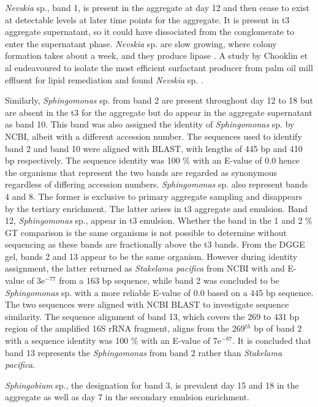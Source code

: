 \documentclass[11pt]{article}
\begin{document}
\emph{Nevskia} sp., band 1, is present in the aggregate at day 12 and then cease to exist at detectable levels at later time points for the aggregate. It is present in t3 aggregate supernatant, so it could have dissociated from the conglomerate to enter the supernatant phase. \emph{Nevskia} sp. are slow growing, where colony formation takes about a week, and they produce lipase \cite{kim2011nevskia}. A study by Chooklin et al endeavoured to isolate the most efficient surfactant producer from palm oil mill effluent for lipid remediation and found \emph{Nevskia} sp. \cite{chooklinutilization}.


Similarly, \emph{Sphingomonas} sp. from band 2 are present throughout day 12 to 18 but are absent in the t3 for the aggregate but do appear in the aggregate supernatant as band 10. This band was also assigned the identity of \emph{Sphingomonas} sp. by NCBI, albeit with a different accession number. The sequences used to identify band 2 and band 10 were aligned with BLAST, with lengths of 445 bp and 410 bp respectively. The sequence identity was 100 \% with an E-value of 0.0 hence the organisms that represent the two bands are regarded as synonymous regardless of differing accession numbers.
\emph{Sphingomonas} sp. also represent bands 4 and 8. The former is exclusive to primary aggregate sampling and disappears by the tertiary enrichment. The latter arises in t3 aggregate and emulsion.
Band 12, \emph{Sphingomonas} sp., appear in t3 emulsion. Whether the band in the 1 and 2 \% GT comparison is the same organisms is not possible to determine without sequencing as these bands are fractionally above the t3 bands.
From the DGGE gel, bands 2 and 13 appear to be the same organism. However during identity assignment, the latter returned as \emph{Stakelama pacifica} from NCBI with and E-value of 3e$^{-77}$ from a 163 bp sequence, while band 2 was concluded to be \emph{Sphingomonas} sp. with a more reliable E-value of 0.0 based on a 445 bp sequence. The two sequences were aligned with NCBI BLAST to investigate sequence similarity. The sequence alignment of band 13, which covers the 269 to 431 bp region of the amplified 16S rRNA fragment, aligns from the 269$^{th}$ bp of band 2 with a sequence identity was 100 \% with an E-value of 7e$^{-87}$. It is concluded that band 13 represents the \emph{Sphingomonas} from band 2 rather than \emph{Stakelama pacifica}.

\emph{Sphingobium} sp., the designation for band 3, is prevalent day 15 and 18 in the aggregate as well as day 7 in the secondary emulsion enrichment.
\end{document}
